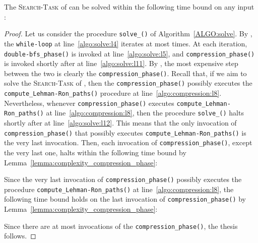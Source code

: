 \begin{proposition}\label{prop:complexity_solve_search}
The \textsc{Search-Task} of {\mainproblem} can be solved within the following time bound
on any input :

\end{proposition}
\begin{proof}
Let us consider the procedure \texttt{solve\_\mainproblem()} of Algorithm~\ref{ALGO:solve}.
By , the \texttt{while-loop} at line~\ref{algo:solve:l4} iterates at most  times.
At each iteration, \texttt{double-bfs\_phase()} is invoked at line~\ref{algo:solve:l5},
and \texttt{compression\_phase()} is invoked shortly after at line~\ref{algo:solve:l11}.
By , the most expensive step between the two is clearly the \texttt{compression\_phase()}.
Recall that, if we aim to solve the \textsc{Search-Task} of \mainproblem, then the \texttt{compression\_phase()} possibly executes
the \texttt{compute\_Lehman-Ron\_paths()} procedure at line~\ref{algo:compression:l8}.
Nevertheless, whenever \texttt{compression\_phase()} executes \texttt{compute\_Lehman-Ron\_paths()} at line~\ref{algo:compression:l8},
then the procedure \texttt{solve\_\mainproblem()} halts shortly after at line~\ref{algo:solve:l12}.
This means that the only invocation of \texttt{compression\_phase()} that possibly
executes \texttt{compute\_Lehman-Ron\_paths()} is the very last invocation.
Then, each invocation of \texttt{compression\_phase()}, except the very last one,
halts within the following time bound by Lemma~\ref{lemma:complexity_compression_phase}:

Since the very last invocation of \texttt{compression\_phase()} possibly executes the procedure
\texttt{compute\_Lehman-Ron\_paths()} at line~\ref{algo:compression:l8}, the following time bound holds on the last invocation of
\texttt{compression\_phase()} by Lemma~\ref{lemma:complexity_compression_phase}:

Since there are at most  invocations of the \texttt{compression\_phase()}, the thesis follows.
\end{proof}
